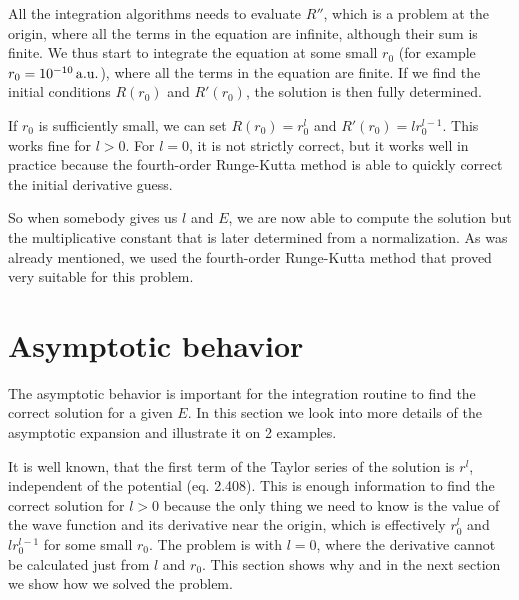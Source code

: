 All the integration algorithms needs to evaluate $R''$, which is a
problem at the origin, where all the terms in the equation are infinite,
although their sum is finite. We thus start to integrate the equation at some
small $r_0$ (for example $r_0=10^{-10}\rm\,a.u.$), where all the terms in the
equation are finite. If we find the initial conditions $R(r_0)$ and
$R'(r_0)$, the solution is then fully determined.

If $r_0$ is sufficiently small, we can set $R(r_0)=r_0^l$ and
$R'(r_0)=lr_0^{l-1}$. This works fine for $l>0$. For $l=0$, it is not strictly
correct, but it works well
in practice because the fourth-order Runge-Kutta method is able to quickly
correct the initial derivative guess.

So when somebody gives us $l$ and $E$, we are now able to compute the solution
but the multiplicative constant that is later determined from a
normalization. As was already mentioned, we used the fourth-order Runge-Kutta
method that proved very suitable for this problem. 



\section{Asymptotic behavior}

The asymptotic behavior is important for the integration routine to find
the correct solution for a given $E$. In this section we look into more details
of the asymptotic expansion and illustrate it on 2 examples.

It is well known, that the first
term of the Taylor series of the solution is $r^l$, independent
of the potential \cite{formanek} (eq. 2.408). This is enough
information to find the correct solution for $l>0$ because the only
thing we need to know is the value of the wave function and its derivative
near the origin, which is effectively $r_0^l$ and $lr_0^{l-1}$ for some small
$r_0$. The problem is with $l=0$, where the
derivative cannot be calculated just from $l$ and $r_0$. This section shows why
and in the next section we show how we solved the problem.

